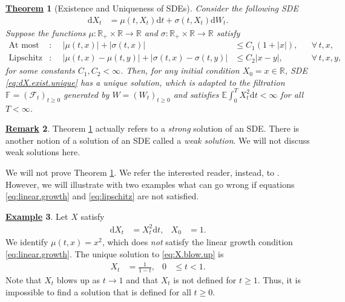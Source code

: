 \documentclass[12pt]{book}
\numberwithin{equation}{chapter}
\theoremstyle{plain}
\newtheorem{theorem}{\underline{Theorem}}
\numberwithin{theorem}{section}
\theoremstyle{definition}
\newtheorem{example}[theorem]{\underline{Example}}
\newtheorem{remark}[theorem]{\underline{Remark}}
\numberwithin{exercise}{chapter}
\newcommand{\<}{\langle}
\renewcommand{\>}{\rangle}
\renewcommand{\(}{\left(}
\renewcommand{\)}{\right)}
\renewcommand{\[}{\left[}
\renewcommand{\]}{\right]}
\newcommand\Eb{\mathds{E}}
\newcommand\Fb{\mathds{F}}
\newcommand\Rb{\mathds{R}}
\newcommand\Fc{\mathscr{F}}
\newcommand\sig{\sigma}
\newcommand\dd{\mathrm{d}}
\begin{document}
\begin{theorem}[Existence and Uniqueness of SDEs]
\label{thm:exist.unique}
Consider the following SDE
\begin{align}
\dd X_t
	&=	\mu(t,X_t) \dd t + \sig(t,X_t) \dd W_t . \label{eq:dX.exist.unique}
\end{align}
Suppose the functions $\mu: \Rb_+ \times \Rb \to \Rb$ and $\sig : \Rb_+ \times \Rb \to \Rb$ satisfy
\begin{align}
\text{At most linear growth}:&&
|\mu(t,x)| + |\sig(t,x)|
	&\leq C_1 ( 1 + |x| ) , &
	&\forall \, t, x, \label{eq:linear.growth} \\
\text{Lipschitz continuity}:&&
| \mu(t,x) - \mu(t,y) | + | \sig(t,x) - \sig(t,y) |
	&\leq C_2 | x - y | , &
	&\forall \, t, x, y , \label{eq:lipschitz}
\end{align}
for some constants $C_1,C_2 < \infty$.  Then, for any initial condition $X_0 = x \in \Rb$, SDE \eqref{eq:dX.exist.unique} has a unique solution, which is adapted to the filtration $\Fb=(\Fc_t)_{t \geq 0}$ generated by $W = (W_t)_{t \geq 0}$ and satisfies $\Eb \int_0^T X_t^2 \dd t < \infty$ for all $T< \infty$.
\end{theorem}

\begin{remark}
Theorem \ref{thm:exist.unique} actually refers to a \emph{strong} solution of an SDE.  There is another notion of a solution of an SDE called a \emph{weak solution}.  We will not discuss weak solutions here.
\end{remark}

\noindent
We will not prove Theorem \ref{thm:exist.unique}.  We refer the interested reader, instead, to \cite[Theorem 5.21]{oksendal}.  However, we will illustrate with two examples what can go wrong if equations \eqref{eq:linear.growth} and \eqref{eq:lipschitz} are not satisfied.

\begin{example}
Let $X$ satisfy
\begin{align}
\dd X_t
	&=	X_t^2 \dd t , &
X_0
	&=	1 . \label{eq:X.blow.up}
\end{align}
We identify $\mu(t,x) = x^2$, which does \emph{not} satisfy the linear growth condition \eqref{eq:linear.growth}.  The unique solution to \eqref{eq:X.blow.up} is
\begin{align}
X_t
	&=	\frac{1}{1-t} , &
0
	&\leq t < 1 .
\end{align}
Note that $X_t$ blows up as $t \to 1$ and that $X_t$ is not defined for $t \geq 1$.  Thus, it is impossible to find a solution that is defined for all $t \geq 0$.
\end{example}
\end{document}
